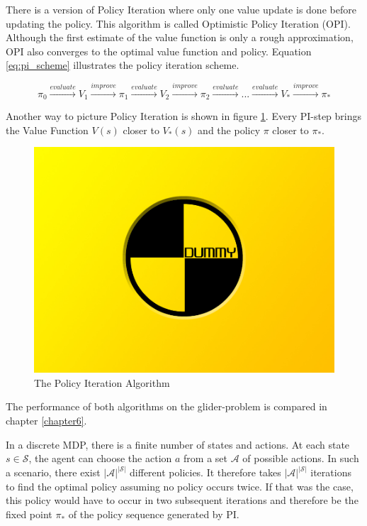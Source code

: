 There is a version of Policy Iteration where only one value update is done before updating the policy. This algorithm is called Optimistic Policy Iteration (OPI). Although the first estimate of the value function is only a rough approximation, OPI also converges to the optimal value function and policy. Equation \ref{eq:pi_scheme} illustrates the policy iteration scheme.

\begin{equation*}
\pi_0 \overset{evaluate}{\longrightarrow} V_1 \overset{improve}{\longrightarrow} \pi_1 \overset{evaluate}{\longrightarrow} V_2 \overset{improve}{\longrightarrow} \pi_2 \overset{evaluate}{\longrightarrow} ... \overset{evaluate}{\longrightarrow} V_* \overset{improve}{\longrightarrow} \pi_*
\label{eq:pi_scheme}
\end{equation*}

Another way to picture Policy Iteration is shown in figure \ref{fig:PI_triangle}. Every PI-step brings the Value Function $V(s)$ closer to $V_*(s)$ and the policy $\pi$ closer to $\pi_*$.

\begin{figure}[h]
	\includegraphics[width=\textwidth]{src/pics/dummy.jpg}
	\caption{The Policy Iteration Algorithm}
	\label{fig:PI_triangle} 
\end{figure}

The performance of both algorithms on the glider-problem is compared in chapter \ref{chapter6}. \bigbreak

In a discrete MDP, there is a finite number of states and actions. At each state $s \in \mathcal{S}$, the agent can choose the action $a$ from a set $\mathcal{A}$ of possible actions. In such a scenario, there exist $|\mathcal{A}|^{|\mathcal{S}|}$ different policies. It therefore takes $|\mathcal{A}|^{|\mathcal{S}|}$ iterations to find the optimal policy assuming no policy occurs twice. If that was the case, this policy would have to occur in two subsequent iterations and therefore be the fixed point $\pi_*$ of the policy sequence generated by PI.

